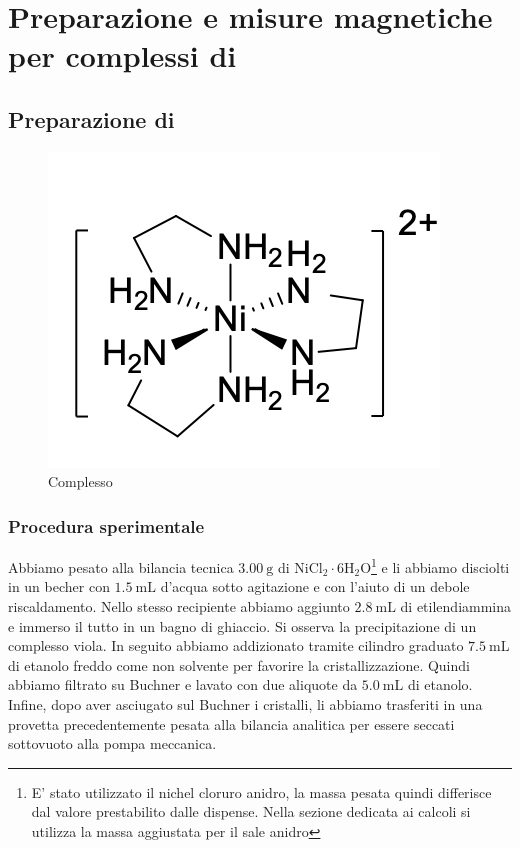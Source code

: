 
\section{Preparazione e misure magnetiche per complessi di }

\subsection{Preparazione di  }
\begin{figure}[ht!]
    \centering
    \includegraphics[width=0.3\linewidth]{foto/nien.png}
    \caption{Complesso  }
    \label{fig:nien}
\end{figure}
\subsubsection{Procedura sperimentale}
Abbiamo pesato alla bilancia tecnica $3.00 \mathrm{~g}$ di $\mathrm{NiCl}_2 \cdot 6 \mathrm{H}_2 \mathrm{O}$\footnote{ E' stato utilizzato il nichel cloruro anidro, la massa pesata quindi differisce dal valore prestabilito dalle dispense. Nella sezione dedicata ai calcoli si utilizza la massa aggiustata per il sale anidro} e li abbiamo disciolti in un becher con $1.5 \mathrm{~mL}$ d'acqua sotto agitazione e con l'aiuto di un debole riscaldamento. Nello stesso recipiente abbiamo aggiunto $2.8 \mathrm{~mL}$ di etilendiammina e immerso il tutto in un bagno di ghiaccio. Si osserva la precipitazione di un complesso viola. In seguito abbiamo addizionato tramite cilindro graduato $7.5 \mathrm{~mL}$ di etanolo freddo come non solvente per favorire la cristallizzazione. Quindi abbiamo filtrato su Buchner e lavato con due aliquote da $5.0 \mathrm{~mL}$ di etanolo. Infine, dopo aver asciugato sul Buchner i cristalli, li abbiamo trasferiti in una provetta precedentemente pesata alla bilancia analitica per essere seccati sottovuoto alla pompa meccanica.

